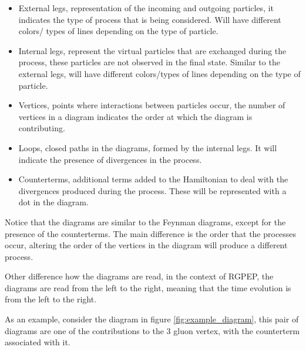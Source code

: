 \documentclass[11pt,a4paper,twoside,pdf]{article}
\numberwithin{equation}{section}
\begin{document}
\begin{itemize}
    \item External legs, representation of the incoming and outgoing particles, it 
    indicates the type of process that is being considered. Will have different colors/
    types of lines depending on the type of particle.
    \item Internal legs, represent the virtual particles that are exchanged during the
    process, these particles are not observed in the final state. Similar to the
    external legs, will have different colors/types of lines depending on the type of
    particle.
    \item Vertices, points where interactions between particles occur, the number of
    vertices in a diagram indicates the order at which the diagram is contributing.
    \item Loops, closed paths in the diagrams, formed by the internal legs. It will
    indicate the presence of divergences in the process.
    \item Counterterms, additional terms added to the Hamiltonian to deal with the divergences
    produced during the process. These will be represented with a dot in the diagram.
\end{itemize}

Notice that the diagrams are similar to the Feynman diagrams, except for the presence
of the counterterms. The main difference is the order that the processes occur, altering
the order of the vertices in the diagram will produce a different process. 

Other difference how the diagrams are read, in the context of RGPEP, the diagrams are
read from the left to the right, meaning that the time evolution is from the left to 
the right.

As an example, consider the diagram in figure \ref{fig:example_diagram}, this pair of 
diagrams are one of the contributions to the 3 gluon vertex, with the counterterm 
associated with it. 
\end{document}
